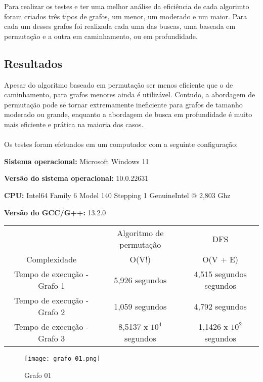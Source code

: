 \documentclass[12pt]{article}
\begin{document}
Para realizar os testes e ter uma melhor análise da eficiência de cada algorimto foram criados três tipos de grafos, um menor, um moderado e um maior. Para cada um desses grafos foi realizada cada uma das buscas, uma baseada em permutação e a outra em caminhamento, ou em profundidade.

\subsection{Resultados}

 Apesar do algoritmo baseado em permutação ser menos eficiente que o de caminhamento, para grafos menores ainda é utilizável. Contudo, a abordagem de permutação pode se tornar extremamente ineficiente para grafos de tamanho moderado ou grande, enquanto a abordagem de busca em profundidade é muito mais eficiente e prática na maioria dos casos. \\ \\ Os testes foram efetuados em um computador com a seguinte configuração:

\textbf{Sistema operacional:} Microsoft Windows 11

\textbf{Versão do sistema operacional:} 10.0.22631

\textbf{CPU:} Intel64 Family 6 Model 140 Stepping 1 GenuineIntel @ 2,803 Ghz

\textbf{Versão do GCC/G++:} 13.2.0

\begin{table}[ht]
    \begin{tabular}{|c|c|c|}
    \hline
    ~                           & Algoritmo de permutação          & DFS                      \\
    Complexidade                & O(V!)                   & O(V + E)                 \\
    \hline
    Tempo de execução - Grafo 1 & 5,926 segundos  & 4,515 segundos segundos\\
    \hline
    Tempo de execução - Grafo 2 & 1,059 segundos  & 4,792 segundos\\
    \hline
    Tempo de execução - Grafo 3 & 8,5137 x $10^{4}$ segundos  & 1,1426 x $10^{2}$ segundos\\ 
    \hline    
    \end{tabular}
\end{table} 

\begin{figure}[htbp]
  \centering
  \texttt{[image: grafo\_01.png]}
  \caption{Grafo 01}
  \label{fig:sua-imagem}
\end{figure}
\end{document}
